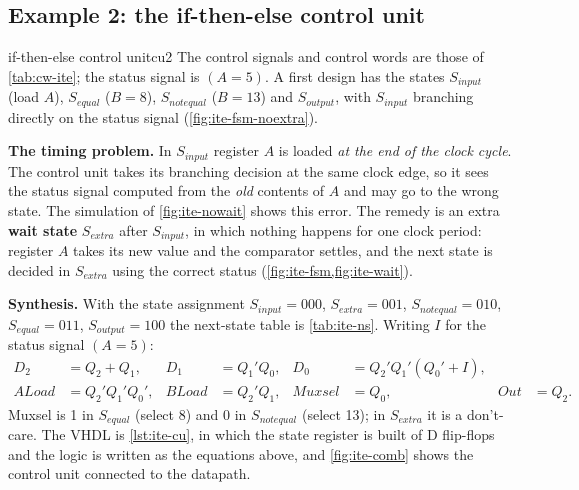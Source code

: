 \subsection{Example 2: the if-then-else control unit}
\begin{example}{if-then-else control unit}{cu2}
The control signals and control words are those of \cref{tab:cw-ite}; the status signal is $(A=5)$. A first design has the states $S_{input}$ (load $A$), $S_{equal}$ ($B=8$), $S_{notequal}$ ($B=13$) and $S_{output}$, with $S_{input}$ branching directly on the status signal (\cref{fig:ite-fsm-noextra}).

\textbf{The timing problem.} In $S_{input}$ register $A$ is loaded \emph{at the end of the clock cycle}. The control unit takes its branching decision at the same clock edge, so it sees the status signal computed from the \emph{old} contents of $A$ and may go to the wrong state. The simulation of \cref{fig:ite-nowait} shows this error. The remedy is an extra \textbf{wait state} $S_{extra}$ after $S_{input}$, in which nothing happens for one clock period: register $A$ takes its new value and the comparator settles, and the next state is decided in $S_{extra}$ using the correct status (\cref{fig:ite-fsm,fig:ite-wait}).

\textbf{Synthesis.} With the state assignment $S_{input}=000$, $S_{extra}=001$, $S_{notequal}=010$, $S_{equal}=011$, $S_{output}=100$ the next-state table is \cref{tab:ite-ns}. Writing $I$ for the status signal $(A=5)$:
\begin{align*}
 D_2 &= Q_2+Q_1, & D_1 &= Q_1'Q_0, & D_0 &= Q_2'Q_1'(Q_0'+I),\\
 ALoad &= Q_2'Q_1'Q_0', & BLoad &= Q_2'Q_1, & Muxsel &= Q_0, & Out &= Q_2 .
\end{align*}
Muxsel is 1 in $S_{equal}$ (select 8) and 0 in $S_{notequal}$ (select 13); in $S_{extra}$ it is a don't-care. The VHDL is \cref{lst:ite-cu}, in which the state register is built of D flip-flops and the logic is written as the equations above, and \cref{fig:ite-comb} shows the control unit connected to the datapath.
\end{example}

